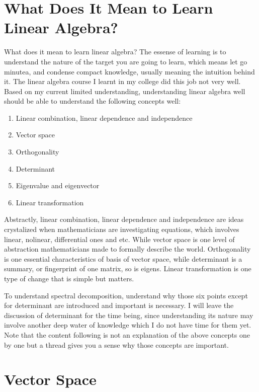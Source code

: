 \documentclass[a4paper]{book}
\begin{document}
  \section{What Does It Mean to Learn Linear Algebra?}

  What does it mean to learn linear algebra? The essense of learning
  is to understand the nature of the target you are going to learn,
  which means let go minutea, and condense compact knowledge, usually
  meaning the intuition behind it. The linear algebra course I learnt
  in my college did this job not very well. Based on my current
  limited understanding, understanding linear algebra well should be
  able to understand the following concepts well:

  \begin{enumerate}
    \item Linear combination, linear dependence and independence
    \item Vector space
    \item Orthogonality
    \item Determinant
    \item Eigenvalue and eigenvector
    \item Linear transformation
  \end{enumerate}

  Abstractly, linear combination, linear dependence and independence
  are ideas crystalized when mathematicians are investigating
  equations, which involves linear, nolinear, differential ones and
  etc. While vector space is one level of abstraction mathematicians
  made to formally describe the world. Orthogonality is one essential
  characteristics of basis of vector space, while determinant is a
  summary, or fingerprint of one matrix, so is eigens. Linear
  transformation is one type of change that is simple but matters.

  To understand spectral decomposition, understand why those six points
  except for determinant are introduced and important is necessary. I
  will leave the discussion of determinant for the time being, since
  understanding its nature may involve another deep water of knowledge
  which I do not have time for them yet. Note that the content following
  is not an explanation of the above concepts one by one but a thread
  gives you a sense why those concepts are important.

  \section{Vector Space}
\end{document}
